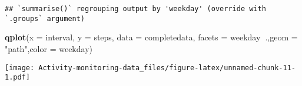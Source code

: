 \documentclass[]{article}
\newenvironment{Shaded}{\begin{snugshade}}{\end{snugshade}}
\newcommand{\KeywordTok}[1]{\textcolor[rgb]{0.13,0.29,0.53}{\textbf{#1}}}
\newcommand{\DataTypeTok}[1]{\textcolor[rgb]{0.13,0.29,0.53}{#1}}
\newcommand{\StringTok}[1]{\textcolor[rgb]{0.31,0.60,0.02}{#1}}
\newcommand{\OperatorTok}[1]{\textcolor[rgb]{0.81,0.36,0.00}{\textbf{#1}}}
\newcommand{\NormalTok}[1]{#1}
\begin{document}
\begin{Shaded}
\end{Shaded}

\begin{verbatim}
## `summarise()` regrouping output by 'weekday' (override with `.groups` argument)
\end{verbatim}

\begin{Shaded}
\begin{Highlighting}[]
\KeywordTok{qplot}\NormalTok{(}\DataTypeTok{x =}\NormalTok{ interval, }\DataTypeTok{y =}\NormalTok{ steps, }\DataTypeTok{data =}\NormalTok{ completedata, }\DataTypeTok{facets =}\NormalTok{ weekday}\OperatorTok{~}\NormalTok{.,}\DataTypeTok{geom =} \StringTok{"path"}\NormalTok{,}\DataTypeTok{color =}\NormalTok{ weekday)}
\end{Highlighting}
\end{Shaded}

\texttt{[image: Activity-monitoring-data\_files/figure-latex/unnamed-chunk-11-1.pdf]}
\end{document}

